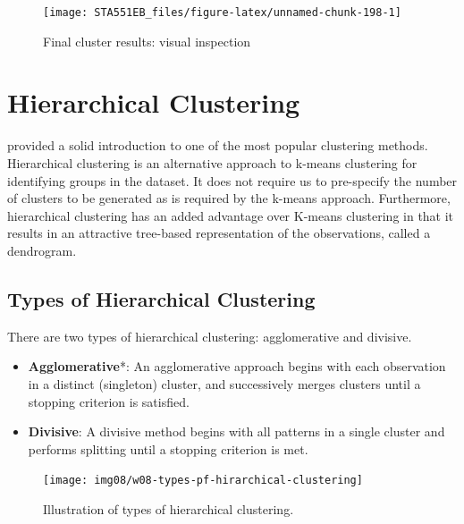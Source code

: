 \documentclass[
]{book}
\begin{document}
\begin{figure}

{\centering \texttt{[image: STA551EB\_files/figure-latex/unnamed-chunk-198-1]} 

}

\caption{Final cluster results: visual inspection}\label{fig:unnamed-chunk-198}
\end{figure}

\hypertarget{hierarchical-clustering}{%
\section{Hierarchical Clustering}\label{hierarchical-clustering}}

provided a solid introduction to one of the most popular clustering methods. Hierarchical clustering is an alternative approach to k-means clustering for identifying groups in the dataset. It does not require us to pre-specify the number of clusters to be generated as is required by the k-means approach. Furthermore, hierarchical clustering has an added advantage over K-means clustering in that it results in an attractive tree-based representation of the observations, called a dendrogram.

\hypertarget{types-of-hierarchical-clustering}{%
\subsection{Types of Hierarchical Clustering}\label{types-of-hierarchical-clustering}}

There are two types of hierarchical clustering: agglomerative and divisive.

\begin{itemize}
\item
  \textbf{Agglomerative}*: An agglomerative approach begins with each observation in a distinct (singleton) cluster, and successively merges clusters until a stopping criterion is satisfied.
\item
  \textbf{Divisive}: A divisive method begins with all patterns in a single cluster and performs splitting until a stopping criterion is met.
\end{itemize}

\begin{figure}

{\centering \texttt{[image: img08/w08-types-pf-hirarchical-clustering]} 

}

\caption{Illustration of types of hierarchical clustering.}\label{fig:unnamed-chunk-199}
\end{figure}
\end{document}
